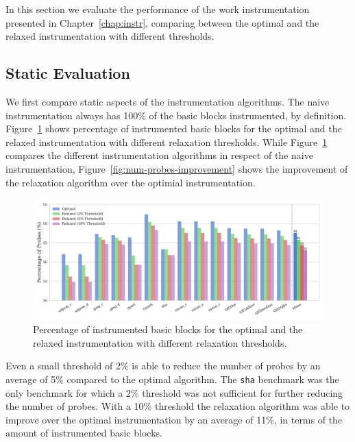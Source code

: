 In this section we evaluate the performance of the work instrumentation presented in Chapter~\ref{chap:instr}, comparing between the optimal and the relaxed instrumentation with different thresholds.

\subsection{Static Evaluation}

We first compare static aspects of the instrumentation algorithms.
The naive instrumentation always has 100\% of the basic blocks instrumented, by definition.
Figure~\ref{fig:num-probes} shows percentage of instrumented basic blocks for the optimal and the relaxed instrumentation with different relaxation thresholds.
While Figure~\ref{fig:num-probes} compares the different instrumentation algorithms in respect of the naive instrumentation, Figure~\ref{fig:num-probes-improvement} shows the improvement of the relaxation algorithm over the optimial instrumentation.

\begin{figure}[ht]
    \centering
    \includegraphics[width=\textwidth]{figs/num-probes.pdf}
    \caption{Percentage of instrumented basic blocks for the optimal and the relaxed instrumentation with different relaxation thresholds.}
    \label{fig:num-probes}
\end{figure}

Even a small threshold of 2\% is able to reduce the number of probes by an average of 5\% compared to the optimal algorithm. 
The \texttt{sha} benchmark was the only benchmark for which a 2\% threshold was not sufficient for further reducing the number of probes.
With a 10\% threshold the relaxation algorithm was able to improve over the optimal instrumentation by an average of 11\%, in terms of the amount of instrumented basic blocks.


